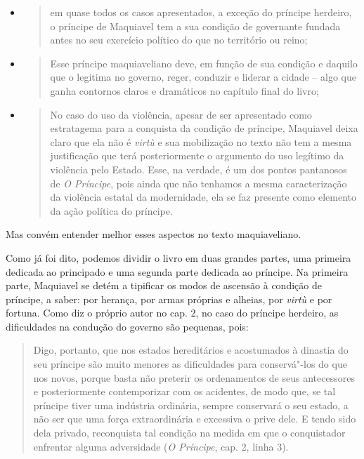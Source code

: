 \begin{itemize}
\item
  \begin{quote}
  em quase todos os casos apresentados, a exceção do príncipe herdeiro,
  o príncipe de Maquiavel tem a sua condição de governante fundada antes
  no seu exercício político do que no território ou reino;
  \end{quote}
\item
  \begin{quote}
  Esse príncipe maquiaveliano deve, em função de sua condição e daquilo
  que o legitima no governo, reger, conduzir e liderar a cidade -- algo
  que ganha contornos claros e dramáticos no capítulo final do livro;
  \end{quote}
\item
  \begin{quote}
  No caso do uso da violência, apesar de ser apresentado como
  estratagema para a conquista da condição de príncipe, Maquiavel deixa
  claro que ela não é \emph{virtù} e sua mobilização no texto não tem a
  mesma justificação que terá posteriormente o argumento do uso legítimo
  da violência pelo Estado. Esse, na verdade, é um dos pontos pantanosos
  de \emph{O Príncipe}, pois ainda que não tenhamos a mesma
  caracterização da violência estatal da modernidade, ela se faz
  presente como elemento da ação política do príncipe.
  \end{quote}
\end{itemize}

Mas convém entender melhor esses aspectos no texto maquiaveliano.

Como já foi dito, podemos dividir o livro em duas grandes partes, uma
primeira dedicada ao principado e uma segunda parte dedicada ao
príncipe. Na primeira parte, Maquiavel se detém a tipificar os modos de
ascensão à condição de príncipe, a saber: por herança, por armas
próprias e alheias, por \emph{virtù} e por fortuna. Como diz o próprio
autor no cap. 2, no caso do príncipe herdeiro, as dificuldades na
condução do governo são pequenas, pois:

\begin{quote}
Digo, portanto, que nos estados hereditários e acostumados à
dinastia do seu príncipe são muito menores as dificuldades para
conservá"-los do que nos novos, porque basta não preterir os ordenamentos
de seus antecessores e posteriormente contemporizar com os acidentes, de
modo que, se tal príncipe tiver uma indústria ordinária, sempre
conservará o seu estado, a não ser que uma força extraordinária e
excessiva o prive dele. E tendo sido dela privado, reconquista tal
condição na medida em que o conquistador enfrentar alguma
adversidade (\emph{O Príncipe}, cap. 2, linha 3).
\end{quote}


